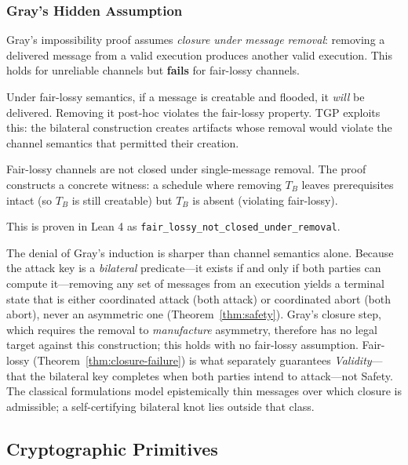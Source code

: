 \subsubsection{Gray's Hidden Assumption}

Gray's impossibility proof assumes \emph{closure under message removal}: removing a delivered message from a valid execution produces another valid execution. This holds for unreliable channels but \textbf{fails} for fair-lossy channels.

Under fair-lossy semantics, if a message is creatable and flooded, it \emph{will} be delivered. Removing it post-hoc violates the fair-lossy property. TGP exploits this: the bilateral construction creates artifacts whose removal would violate the channel semantics that permitted their creation.

\begin{theorem}
\label{thm:closure-failure}
Fair-lossy channels are not closed under single-message removal. The proof constructs a concrete witness: a schedule where removing $T_B$ leaves prerequisites intact (so $T_B$ is still creatable) but $T_B$ is absent (violating fair-lossy).
\end{theorem}

This is proven in Lean 4 as \texttt{fair\_lossy\_not\_closed\_under\_removal}.

\begin{remark}
\label{rmk:closure-defeat}
The denial of Gray's induction is sharper than channel semantics alone. Because the attack key is a \emph{bilateral} predicate---it exists if and only if both parties can compute it---removing any set of messages from an execution yields a terminal state that is either coordinated attack (both attack) or coordinated abort (both abort), never an asymmetric one (Theorem~\ref{thm:safety}). Gray's closure step, which requires the removal to \emph{manufacture} asymmetry, therefore has no legal target against this construction; this holds with no fair-lossy assumption. Fair-lossy (Theorem~\ref{thm:closure-failure}) is what separately guarantees \emph{Validity}---that the bilateral key completes when both parties intend to attack---not Safety. The classical formulations model epistemically thin messages over which closure is admissible; a self-certifying bilateral knot lies outside that class.
\end{remark}

\subsection{Cryptographic Primitives}

